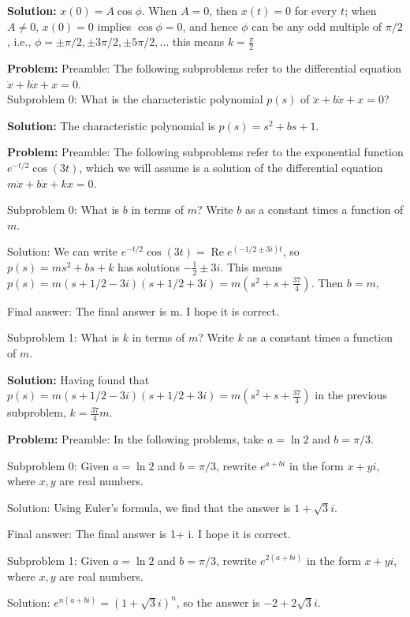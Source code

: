 \documentclass[10pt]{article}
\begin{document}
\textbf{Solution:}
$x(0)=A \cos \phi$. When $A=0$, then $x(t)=0$ for every $t$; when $A \neq 0$, $x(0)=0$ implies $\cos \phi=0$, and hence $\phi$ can be any odd multiple of $\pi / 2$, i.e., $\phi=\pm \pi / 2, \pm 3 \pi / 2, \pm 5 \pi / 2, \ldots$ this means $k=\boxed{\frac{\pi}{2}}$


\textbf{Problem:}
Preamble: The following subproblems refer to the differential equation $\ddot{x}+b \dot{x}+x=0$.\\

Subproblem 0: What is the characteristic polynomial $p(s)$ of $\ddot{x}+b \dot{x}+x=0$?


\textbf{Solution:}
The characteristic polynomial is $p(s)=\boxed{s^{2}+b s+1}$.


\textbf{Problem:}
Preamble: The following subproblems refer to the exponential function $e^{-t / 2} \cos (3 t)$, which we will assume is a solution of the differential equation $m \ddot{x}+b \dot{x}+k x=0$. 

Subproblem 0: What is $b$ in terms of $m$? Write $b$ as a constant times a function of $m$.


Solution: We can write $e^{-t / 2} \cos (3 t)=\operatorname{Re} e^{(-1 / 2 \pm 3 i) t}$, so $p(s)=m s^{2}+b s+k$ has solutions $-\frac{1}{2} \pm 3 i$. This means $p(s)=m(s+1 / 2-3 i)(s+1 / 2+3 i)=m\left(s^{2}+s+\frac{37}{4}\right)$. Then $b=\boxed{m}$, 

Final answer: The final answer is m. I hope it is correct.

Subproblem 1: What is $k$ in terms of $m$? Write $k$ as a constant times a function of $m$.


\textbf{Solution:}
Having found that $p(s)=m(s+1 / 2-3 i)(s+1 / 2+3 i)=m\left(s^{2}+s+\frac{37}{4}\right)$ in the previous subproblem, $k=\boxed{\frac{37}{4} m}$.


\textbf{Problem:}
Preamble: In the following problems, take $a = \ln 2$ and $b = \pi / 3$. 

Subproblem 0: Given $a = \ln 2$ and $b = \pi / 3$, rewrite $e^{a+b i}$ in the form $x + yi$, where $x, y$ are real numbers. 


Solution: Using Euler's formula, we find that the answer is $\boxed{1+\sqrt{3} i}$.

Final answer: The final answer is 1+ i. I hope it is correct.

Subproblem 1: Given $a = \ln 2$ and $b = \pi / 3$, rewrite $e^{2(a+b i)}$ in the form $x + yi$, where $x, y$ are real numbers.


Solution: $e^{n(a+b i)}=(1+\sqrt{3} i)^{n}$, so the answer is $\boxed{-2+2 \sqrt{3} i}$.
\end{document}
